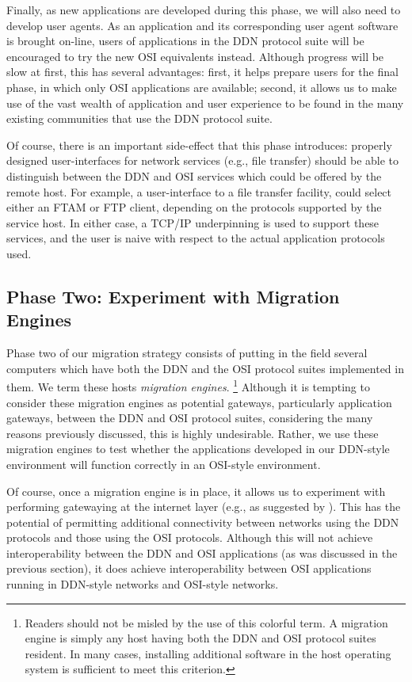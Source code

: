 Finally,
as new applications are developed during this phase,
we will also need to develop user agents.
As an application and its corresponding user agent software is brought
on-line,
users of applications in the DDN protocol suite will be encouraged to try the
new OSI equivalents instead.
Although progress will be slow at first,
this has several advantages:
first, it helps prepare users for the final phase,
in which only OSI applications are available;
second, it allows us to make use of the vast wealth of application and user
experience to be found in the many existing communities that use the DDN
protocol suite.

Of course,
there is an important side-effect that this phase introduces:
properly designed user-interfaces for network services
(e.g., file transfer) should be able to distinguish between the DDN and OSI
services which could be offered by the remote host.
For example,
a user-interface to a file transfer facility,
could select either an FTAM or FTP client,
depending on the protocols supported by the service host.
In either case,
a TCP/IP underpinning is used to support these services,
and the user is naive with respect to the actual application protocols used.

\subsection	{Phase Two: Experiment with Migration Engines}
Phase two of our migration strategy consists of putting in the field several
computers which have both the DDN and the OSI protocol suites implemented in
them.
We term these hosts {\em migration engines}.%
\footnote{Readers should not be misled by the use of this colorful term.
A migration engine is simply any host having both the DDN and OSI protocol
suites resident.
In many cases,
installing additional software in the host operating system is sufficient to
meet this criterion.}
Although it is tempting to consider these migration engines as potential
gateways, particularly application gateways,
between the DDN and OSI protocol suites,
considering the many reasons previously discussed,
this is highly undesirable.
Rather,
we use these migration engines to test whether the applications developed in
our DDN-style environment will function correctly in an OSI-style environment.

Of course,
once a migration engine is in place,
it allows us to experiment with performing gatewaying at the internet layer
(e.g., as suggested by \cite{TCP.convert.ISO}).
This has the potential of permitting additional connectivity between networks
using the DDN protocols and those using the OSI protocols.
Although this will not achieve interoperability between the DDN and OSI
applications (as was discussed in the previous section),
it does achieve interoperability between OSI applications running in DDN-style
networks and OSI-style networks.


